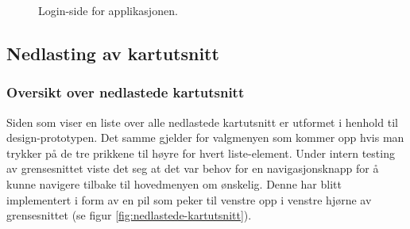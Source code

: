 \begin{figure}[H]
\caption{Login-side for applikasjonen.}
\label{fig:login}
\end{figure}

\subsection{Nedlasting av kartutsnitt}
\subsubsection{Oversikt over nedlastede kartutsnitt}
Siden som viser en liste over alle nedlastede kartutsnitt er utformet i henhold til design-prototypen. Det samme gjelder for valgmenyen som kommer opp hvis man trykker på de tre prikkene til høyre for hvert liste-element. Under intern testing av grensesnittet viste det seg at det var behov for en navigasjonsknapp for å kunne navigere tilbake til hovedmenyen om ønskelig. Denne har blitt implementert i form av en pil som peker til venstre opp i venstre hjørne av grensesnittet (se figur \ref{fig:nedlastede-kartutsnitt}). 
